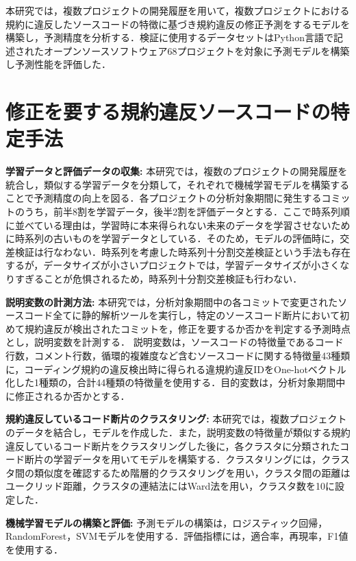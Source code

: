 \documentclass[twocolumn]{jarticle} %
\begin{document}
本研究では，複数プロジェクトの開発履歴を用いて，複数プロジェクトにおける規約に違反したソースコードの特徴に基づき規約違反の修正予測をするモデルを構築し，予測精度を分析する．検証に使用するデータセットはPython言語で記述されたオープンソースソフトウェア68プロジェクトを対象に予測モデルを構築し予測性能を評価した．


\section{修正を要する規約違反ソースコードの特定手法}

\noindent\textbf{学習データと評価データの収集: }本研究では，複数のプロジェクトの開発履歴を統合し，類似する学習データを分類して，それぞれで機械学習モデルを構築することで予測精度の向上を図る．各プロジェクトの分析対象期間に発生するコミットのうち，前半8割を学習データ，後半2割を評価データとする．ここで時系列順に並べている理由は，学習時に本来得られない未来のデータを学習させないために時系列の古いものを学習データとしている．そのため，モデルの評価時に，交差検証は行なわない．時系列を考慮した時系列十分割交差検証という手法も存在するが，データサイズが小さいプロジェクトでは，学習データサイズが小さくなりすぎることが危惧されるため，時系列十分割交差検証も行わない．

\noindent\textbf{説明変数の計測方法: }本研究では，分析対象期間中の各コミットで変更されたソースコード全てに静的解析ツールを実行し，特定のソースコード断片において初めて規約違反が検出されたコミットを，修正を要するか否かを判定する予測時点とし，説明変数を計測する．
説明変数は，ソースコードの特徴量であるコード行数，コメント行数，循環的複雑度など含むソースコードに関する特徴量43種類に，コーディング規約の違反検出時に得られる違規約違反IDをOne-hotベクトル化した1種類の，合計44種類の特徴量を使用する．目的変数は，分析対象期間中に修正されるか否かとする．

\noindent\textbf{規約違反しているコード断片のクラスタリング: }本研究では，複数プロジェクトのデータを結合し，モデルを作成した．また，説明変数の特徴量が類似する規約違反しているコード断片をクラスタリングした後に，各クラスタに分類されたコード断片の学習データを用いてモデルを構築する．クラスタリングには，クラスタ間の類似度を確認するため階層的クラスタリングを用い，クラスタ間の距離はユークリッド距離，クラスタの連結法にはWard法を用い，クラスタ数を10に設定した．

\noindent\textbf{機械学習モデルの構築と評価: }予測モデルの構築は，ロジスティック回帰，RandomForest，SVMモデルを使用する．評価指標には，適合率，再現率，F1値を使用する．

\vspace{-2mm}
\end{document}
